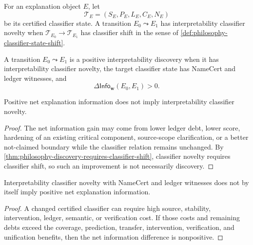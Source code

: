 \begin{definition}
\label{def:philosophy-interpretability-classifier-novelty}
For an explanation object $E$, let
$$
\mathcal T_E=(S_E,P_E,L_E,C_E,N_E)
$$
be its certified classifier state. A transition $E_0\leadsto E_1$ has
interpretability classifier novelty when
$\mathcal T_{E_0}\to\mathcal T_{E_1}$ has classifier shift in the sense
of \autoref{def:philosophy-classifier-state-shift}.
\end{definition}

\begin{definition}
\label{def:philosophy-positive-interpretability-discovery}
A transition $E_0\leadsto E_1$ is a positive interpretability discovery
when it has interpretability classifier novelty, the target classifier
state has NameCert and ledger witnesses, and
$$
\Delta\mathsf{Info}_{\mathbf w}(E_0,E_1)>0.
$$
\end{definition}

\begin{theorem}
\label{thm:philosophy-explanation-improvement-need-not-discovery}
Positive net explanation information does not imply interpretability
classifier novelty.
\end{theorem}
\begin{proof}
The net information gain may come from lower ledger debt, lower score,
hardening of an existing critical component, source-scope clarification,
or a better not-claimed boundary while the classifier relation remains
unchanged. By \autoref{thm:philosophy-discovery-requires-classifier-shift},
classifier novelty requires classifier shift, so such an improvement is
not necessarily discovery.
\end{proof}

\begin{theorem}
\label{thm:philosophy-interpretability-discovery-need-not-positive}
Interpretability classifier novelty with NameCert and ledger witnesses
does not by itself imply positive net explanation information.
\end{theorem}
\begin{proof}
A changed certified classifier can require high source, stability,
intervention, ledger, semantic, or verification cost. If those costs and
remaining debts exceed the coverage, prediction, transfer, intervention,
verification, and unification benefits, then the net information
difference is nonpositive.
\end{proof}

